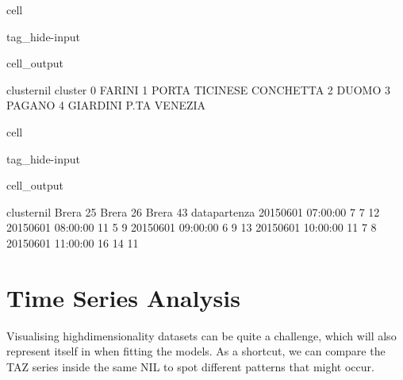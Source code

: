 \documentclass[letterpaper,10pt,english]{jupyterBook}
\begin{document}
\begin{sphinxuseclass}{cell}
\begin{sphinxuseclass}{tag_hide-input}
\begin{sphinxuseclass}{cell_output}
\begin{sphinxVerbatim}[commandchars=\\\{\}]
                        cluster\PYGZus{}nil
cluster                            
0                            FARINI
1        PORTA TICINESE \PYGZhy{} CONCHETTA
2                             DUOMO
3                            PAGANO
4             GIARDINI P.TA VENEZIA
\end{sphinxVerbatim}

\end{sphinxuseclass}
\end{sphinxuseclass}
\end{sphinxuseclass}
\begin{sphinxuseclass}{cell}
\begin{sphinxuseclass}{tag_hide-input}
\begin{sphinxuseclass}{cell_output}
\begin{sphinxVerbatim}[commandchars=\\\{\}]
cluster\PYGZus{}nil          Brera \PYGZhy{} 25  Brera \PYGZhy{} 26  Brera \PYGZhy{} 43
data\PYGZus{}partenza                                          
2015\PYGZhy{}06\PYGZhy{}01 07:00:00           7           7          12
2015\PYGZhy{}06\PYGZhy{}01 08:00:00          11           5           9
2015\PYGZhy{}06\PYGZhy{}01 09:00:00           6           9          13
2015\PYGZhy{}06\PYGZhy{}01 10:00:00          11           7           8
2015\PYGZhy{}06\PYGZhy{}01 11:00:00          16          14          11
\end{sphinxVerbatim}

\end{sphinxuseclass}
\end{sphinxuseclass}
\end{sphinxuseclass}

\section{Time Series Analysis}
\label{\detokenize{05-time_series_analysis:id1}}
\sphinxAtStartPar
Visualising high\sphinxhyphen{}dimensionality datasets can be quite a challenge, which will also represent itself in when fitting the models. As a shortcut, we can compare the TAZ series inside the same NIL to spot different patterns that might occur.
\end{document}
